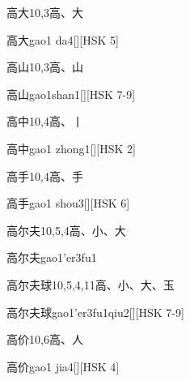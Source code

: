 \begin{Entry}{高大}{10,3}{⾼、⼤}
  \begin{Phonetics}{高大}{gao1 da4}[][HSK 5]
  \end{Phonetics}
\end{Entry}

\begin{Entry}{高山}{10,3}{⾼、⼭}
  \begin{Phonetics}{高山}{gao1shan1}[][HSK 7-9]
  \end{Phonetics}
\end{Entry}

\begin{Entry}{高中}{10,4}{⾼、⼁}
  \begin{Phonetics}{高中}{gao1 zhong1}[][HSK 2]
  \end{Phonetics}
\end{Entry}

\begin{Entry}{高手}{10,4}{⾼、⼿}
  \begin{Phonetics}{高手}{gao1 shou3}[][HSK 6]
  \end{Phonetics}
\end{Entry}

\begin{Entry}{高尔夫}{10,5,4}{⾼、⼩、⼤}
  \begin{Phonetics}{高尔夫}{gao1'er3fu1}
  \end{Phonetics}
\end{Entry}

\begin{Entry}{高尔夫球}{10,5,4,11}{⾼、⼩、⼤、⽟}
  \begin{Phonetics}{高尔夫球}{gao1'er3fu1qiu2}[][HSK 7-9]
  \end{Phonetics}
\end{Entry}

\begin{Entry}{高价}{10,6}{⾼、⼈}
  \begin{Phonetics}{高价}{gao1 jia4}[][HSK 4]
  \end{Phonetics}
\end{Entry}

